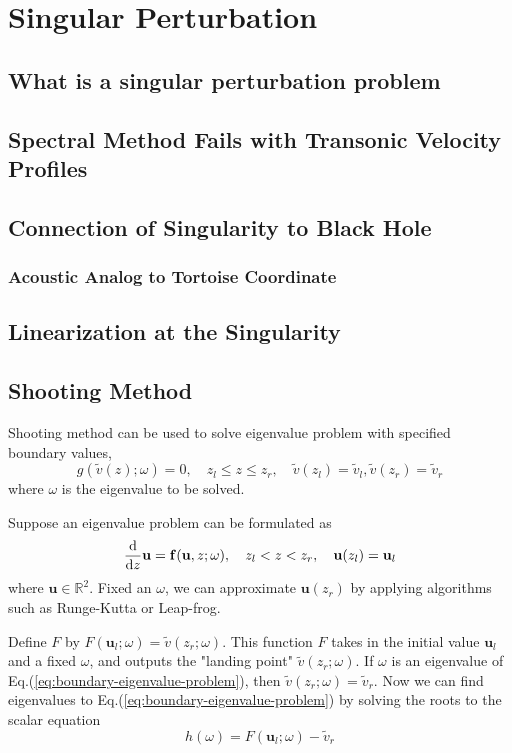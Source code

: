 \chapter{Singular Perturbation}
\section{What is a singular perturbation problem}

\section{Spectral Method Fails with Transonic Velocity Profiles}

\section{Connection of Singularity to Black Hole}
\subsection{Acoustic Analog to Tortoise Coordinate}

\section{Linearization at the Singularity}

\section{Shooting Method}
Shooting method can be used to solve eigenvalue problem with specified boundary values,
\begin{equation} \label{eq:boundary-eigenvalue-problem}
    g(\tilde{v}(z);\omega) = 0,
    \quad
    z_l \leq z \leq z_r,
    \quad
    \tilde{v}(z_l) = \tilde{v}_l, \tilde{v}(z_r) = \tilde{v}_r
\end{equation}
where $\omega$ is the eigenvalue to be solved.

Suppose an eigenvalue problem can be formulated as
\[ \dv{z}\mathbf{u} = \mathbf{f}(\mathbf{u},z;\omega),
    \quad
    z_l<z<z_r,
    \quad
    \mathbf{u}(z_l) = \mathbf{u}_l
\]
where $\mathbf{u}\in\mathbb{R}^2$. Fixed an $\omega$, we can approximate $\mathbf{u}(z_r)$ by applying algorithms such as Runge-Kutta or Leap-frog.

Define $F$ by $F(\mathbf{u}_l;\omega)=\tilde{v}(z_r;\omega)$. This function $F$ takes in the initial value $\mathbf{u}_l$ and a fixed $\omega$, and outputs the "landing point" $\tilde{v}(z_r;\omega)$. If $\omega$ is an eigenvalue of Eq.(\ref{eq:boundary-eigenvalue-problem}), then $\tilde{v}(z_r;\omega) = \tilde{v}_r$. Now we can find eigenvalues to Eq.(\ref{eq:boundary-eigenvalue-problem}) by solving the roots to the scalar equation
\[h(\omega) = F(\mathbf{u}_l;\omega) - \tilde{v}_r\]


